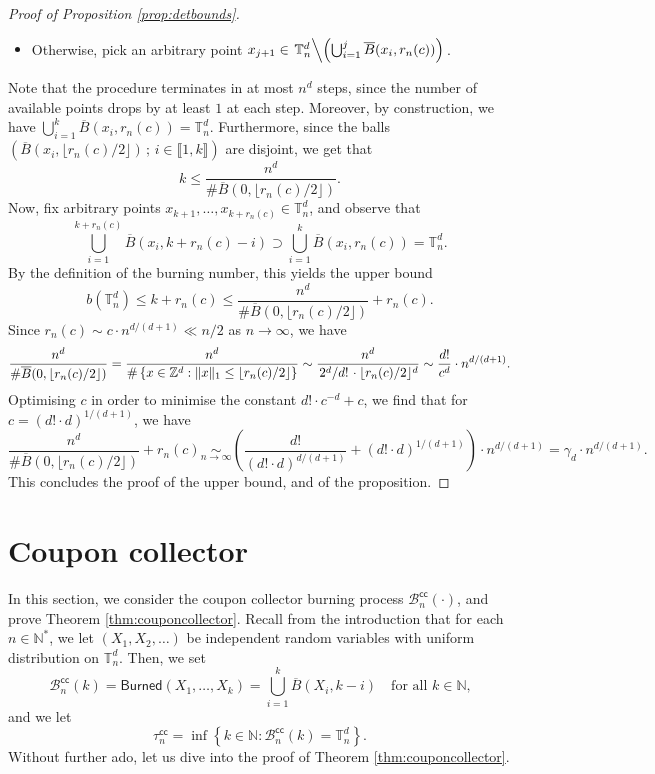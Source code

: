 \documentclass[a4paper,11pt]{article}
\begin{document}
\begin{proof}[Proof of Proposition \ref{prop:detbounds}]
\begin{itemize}
\item Otherwise, pick an arbitrary point $x_{j+1}\in\left.\mathbb{T}_n^d\middle\backslash\left(\bigcup_{i=1}^j\overline{B}(x_i,r_n(c))\right)\right.$.
\end{itemize}
Note that the procedure terminates in at most $n^d$ steps, since the number of available points drops by at least $1$ at each step.
Moreover, by construction, we have ${\bigcup_{i=1}^k\overline{B}(x_i,r_n(c))=\mathbb{T}_n^d}$.
Furthermore, since the balls $\left(\overline{B}(x_i,\lfloor r_n(c)/2\rfloor)\,;\,i\in\llbracket1,k\rrbracket\right)$ are disjoint, we get that
\[k\leq\frac{n^d}{\#\overline{B}(0,\lfloor r_n(c)/2\rfloor)}.\]
Now, fix arbitrary points ${x_{k+1},\ldots,x_{k+r_n(c)}\in\mathbb{T}_n^d}$, and observe that
\[\bigcup_{i=1}^{k+r_n(c)}\overline{B}(x_i,k+r_n(c)-i)\supset\bigcup_{i=1}^k\overline{B}(x_i,r_n(c))=\mathbb{T}_n^d.\]
By the definition of the burning number, this yields the upper bound
\[b\left(\mathbb{T}_n^d\right)\leq k+r_n(c)\leq\frac{n^d}{\#\overline{B}(0,\lfloor r_n(c)/2\rfloor)}+r_n(c).\]
Since $r_n(c)\sim c\cdot n^{d/(d+1)}\ll n/2$ as $n\to\infty$, we have
\[\frac{n^d}{\#\overline{B}(0,\lfloor r_n(c)/2\rfloor)}=\frac{n^d}{\#\left\{x\in\mathbb{Z}^d:\|x\|_1\leq\lfloor r_n(c)/2\rfloor\right\}}\sim\frac{n^d}{\left.2^d\middle/d!\right.\cdot\lfloor r_n(c)/2\rfloor^d}\sim\frac{d!}{c^d}\cdot n^{d/(d+1)}.\]
Optimising $c$ in order to minimise the constant $d!\cdot c^{-d}+c$, we find that for $c=(d!\cdot d)^{1/(d+1)}$, we have
\[\frac{n^d}{\#\overline{B}(0,\lfloor r_n(c)/2\rfloor)}+r_n(c)\underset{n\to\infty}{\sim}\left(\frac{d!}{(d!\cdot d)^{d/(d+1)}}+(d!\cdot d)^{1/(d+1)}\right)\cdot n^{d/(d+1)}=\gamma_d\cdot n^{d/(d+1)}.\]
This concludes the proof of the upper bound, and of the proposition.
\end{proof}

\section{Coupon collector}\label{sec:couponcollector}

In this section, we consider the coupon collector burning process $\mathcal{B}_n^\mathsf{cc}(\cdot)$, and prove Theorem \ref{thm:couponcollector}.
Recall from the introduction that for each $n\in\mathbb{N}^*$, we let $(X_1,X_2,\ldots)$ be independent random variables with uniform distribution on $\mathbb{T}_n^d$.
Then, we set
\[\mathcal{B}_n^\mathsf{cc}(k)=\mathsf{Burned}(X_1,\ldots,X_k)=\bigcup_{i=1}^k\overline{B}(X_i,k-i)\quad\text{for all $k \in \mathbb{N}$,}\]
and we let
\[\tau_n^\mathsf{cc}=\inf\left\{k\in\mathbb{N}:\mathcal{B}_n^\mathsf{cc}(k)=\mathbb{T}_n^d\right\}.\]
Without further ado, let us dive into the proof of Theorem \ref{thm:couponcollector}.
\end{document}
